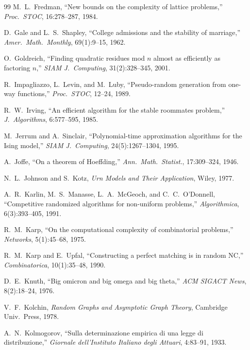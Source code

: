 \documentclass[twoside,12pt]{book}
\theoremstyle{plain}
\theoremstyle{definition}
\theoremstyle{remark}
\begin{document}
\begin{thebibliography}{99}
M.~L.~Fredman,
``New bounds on the complexity of lattice problems,''
\textit{Proc.~STOC}, 16:278--287, 1984.

D.~Gale and L.~S.~Shapley,
``College admissions and the stability of marriage,''
\textit{Amer.~Math.~Monthly}, 69(1):9--15, 1962.

O.~Goldreich,
``Finding quadratic residues mod $n$ almost as efficiently as factoring $n$,''
\textit{SIAM J.~Computing}, 31(2):328--345, 2001.

R.~Impagliazzo, L.~Levin, and M.~Luby,
``Pseudo-random generation from one-way functions,''
\textit{Proc.~STOC}, 12--24, 1989.

R.~W.~Irving,
``An efficient algorithm for the stable roommates problem,''
\textit{J.~Algorithms}, 6:577--595, 1985.

M.~Jerrum and A.~Sinclair,
``Polynomial-time approximation algorithms for the Ising model,''
\textit{SIAM J.~Computing}, 24(5):1267--1304, 1995.

A.~Joffe,
``On a theorem of Hoeffding,''
\textit{Ann.~Math.~Statist.}, 17:309--324, 1946.

N.~L.~Johnson and S.~Kotz,
\textit{Urn Models and Their Application},
Wiley, 1977.

A.~R.~Karlin, M.~S.~Manasse, L.~A.~McGeoch, and C.~C.~O'Donnell,
``Competitive randomized algorithms for non-uniform problems,''
\textit{Algorithmica}, 6(3):393--405, 1991.

R.~M.~Karp,
``On the computational complexity of combinatorial problems,''
\textit{Networks}, 5(1):45--68, 1975.

R.~M.~Karp and E.~Upfal,
``Constructing a perfect matching is in random NC,''
\textit{Combinatorica}, 10(1):35--48, 1990.

D.~E.~Knuth,
``Big omicron and big omega and big theta,''
\textit{ACM SIGACT News}, 8(2):18--24, 1976.

V.~F.~Kolchin,
\textit{Random Graphs and Asymptotic Graph Theory},
Cambridge Univ.~Press, 1978.

A.~N.~Kolmogorov,
``Sulla determinazione empirica di una legge di distribuzione,''
\textit{Giornale dell'Instituto Italiano degli Attuari}, 4:83--91, 1933.


\end{thebibliography}
\end{document}

